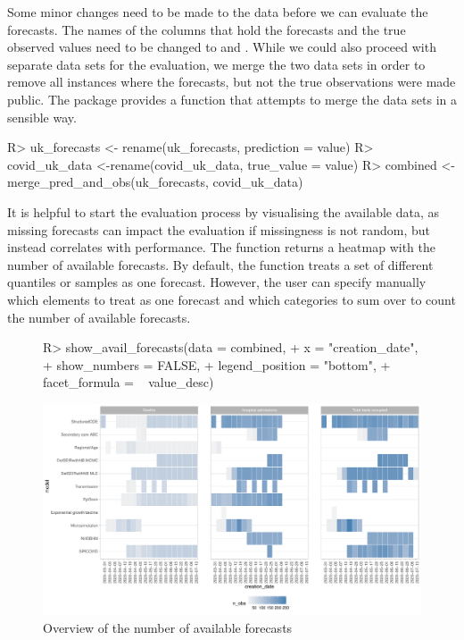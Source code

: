 \documentclass[article,shortnames]{jss}
\newcommand{\fct}[1]{\code{#1()}}
\begin{document}
% 
Some minor changes need to be made to the data before we can evaluate the forecasts. The names of the columns that hold the forecasts and the true observed values need to be changed to  and . While we could also proceed with separate data sets for the evaluation, we merge the two data sets in order to remove all instances where the forecasts, but not the true observations were made public. The  package provides a function that attempts to merge the data sets in a sensible way. 
% 
\begin{Schunk}
\begin{Sinput}
R> uk_forecasts <- rename(uk_forecasts, prediction = value)
R> covid_uk_data <-rename(covid_uk_data, true_value = value)
R> combined <- merge_pred_and_obs(uk_forecasts, covid_uk_data)
\end{Sinput}
\end{Schunk}
% 
It is helpful to start the evaluation process by visualising the available data, as missing forecasts can impact the evaluation if missingness is not random, but instead correlates with performance. The function \fct{show\_avail\_forecasts} returns a heatmap with the number of available forecasts. By default, the function treats a set of different quantiles or samples as one forecast. However, the user can specify manually which elements to treat as one forecast and which categories to sum over to count the number of available forecasts. 
% 
\begin{figure}[h]
\centering
\begin{Schunk}
\begin{Sinput}
R> show_avail_forecasts(data = combined, 
+                       x = "creation_date", 
+                       show_numbers = FALSE,
+                       legend_position = "bottom",
+                       facet_formula = ~ value_desc)
\end{Sinput}
\end{Schunk}
\includegraphics{plots/plot-show-availability}
\caption{\label{fig:avail-forecasts} Overview of the number of available forecasts}
\end{figure}
\end{document}
